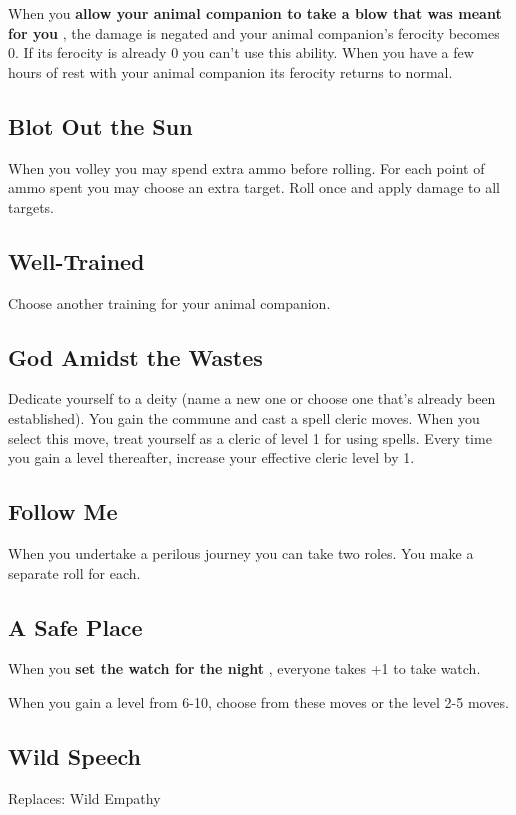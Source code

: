  When you \textbf{allow your animal companion to take a blow that was meant for you}
, the damage is negated and your animal companion's ferocity becomes 0. If its ferocity is already 0 you can't use this ability. When you have a few hours of rest with your animal companion its ferocity returns to normal.
\subsection{Blot Out the Sun}


 When you volley you may spend extra ammo before rolling. For each point of ammo spent you may choose an extra target. Roll once and apply damage to all targets.
\subsection{Well-Trained}


 Choose another training for your animal companion.
\subsection{God Amidst the Wastes}


 Dedicate yourself to a deity (name a new one or choose one that's already been established). You gain the commune and cast a spell cleric moves. When you select this move, treat yourself as a cleric of level 1 for using spells. Every time you gain a level thereafter, increase your effective cleric level by 1.
\subsection{Follow Me}


 When you undertake a perilous journey you can take two roles. You make a separate roll for each.
\subsection{A Safe Place}


 When you \textbf{set the watch for the night}
, everyone takes +1 to take watch.


\vspace{\baselineskip}
 {\Large When you gain a level from 6-10, choose from these moves or the level 2-5 moves.}
\subsection{Wild Speech}


 Replaces: Wild Empathy


